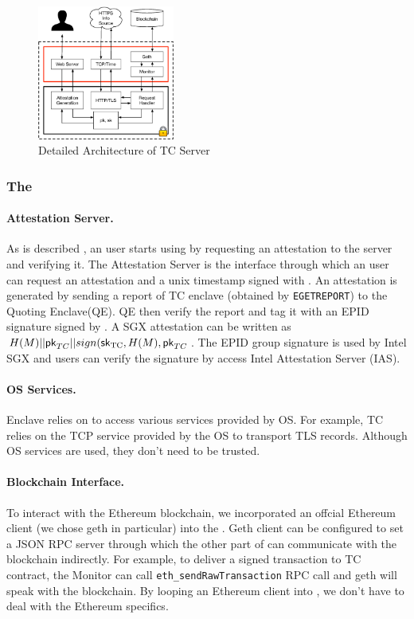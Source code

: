 \begin{figure}[h]
    \centering
    \includegraphics[width=0.4\textwidth]{figures/impl}
    \caption{Detailed Architecture of TC Server}
    \label{fig:tcserver_impl}
\end{figure}

\subsubsection{The \medname}

\paragraph{Attestation Server.} As is described , an user starts
using \tc by requesting an attestation to the \tc server and verifying it.  The
Attestation Server is the interface through which an user can request an
attestation and a unix timestamp signed with \pkTC. An attestation is generated
by sending a report of TC enclave (obtained by \texttt{EGETREPORT}) to the Quoting Enclave(QE). 
QE then verify the report and tag it with an EPID signature signed by \sksgx. 
A SGX attestation can be written as $H(M) || {\sf pk}_{TC} || sign({\sf sk}_{\textrm{TC}}, H(M), {\sf pk}_{TC}$.
The EPID group signature is used by Intel SGX and users can verify the signature
by access Intel Attestation Server (IAS). 

\paragraph{OS Services.} Enclave relies on \medname to access various services 
provided by OS. For example, TC \medname relies on the TCP service provided by
the OS to transport TLS records. Although OS services are used, they don't need
to be trusted. 

\paragraph{Blockchain Interface.} To interact with the Ethereum blockchain, we
incorporated an offcial Ethereum client (we chose geth in particular) into the
\medname.  Geth client can be configured to set a JSON RPC server through which
the other part of \medname can communicate with the blockchain indirectly. 
For example, to deliver a signed transaction to TC contract, the Monitor can
call \texttt{eth\_sendRawTransaction} RPC call and geth will speak with the blockchain.
By looping an Ethereum client into \medname, we don't have to deal with the Ethereum
specifics.


